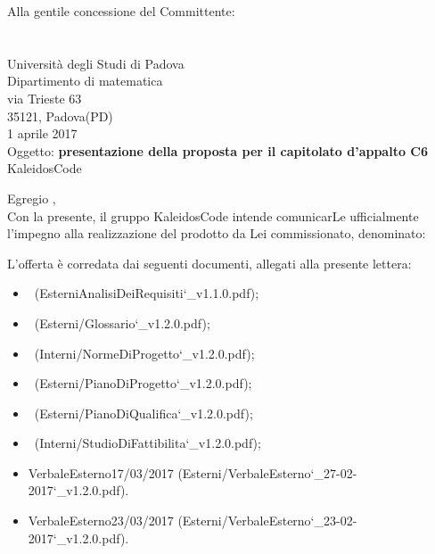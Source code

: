 \documentclass[a4paper,12pt]{article}
\author{KaleidosCode}
\date{10/03/2017}	%
\begin{document}
 	\begin{titlepage}
 		\centering
 		\logo
 		\vspace{1.2cm}
 		\flushright Alla gentile concessione del Committente: \\
 		\vardanega \\
 		\cardin\\
 		Università degli Studi di Padova \\
 		Dipartimento di matematica\\
 		via Trieste 63\\
 		35121, Padova(PD)\\
 		\vspace{0.5cm}
 		1 aprile 2017\\
 		\vspace{1.4cm}
 		\flushleft
 		Oggetto: \textbf{presentazione della proposta per il capitolato d’appalto C6}
 		\vspace{0.4cm}
		\flushleft	\responsabilediprogetto\\
		KaleidosCode 
		
		\vspace{0.6cm}
		Egregio \vardanega ,\\
		\vspace{0.4cm}
		Con la presente, il gruppo KaleidosCode intende comunicarLe ufficialmente l’impegno alla realizzazione del prodotto da Lei commissionato, denominato:
		
		
		L’offerta è corredata dai seguenti documenti, allegati alla presente lettera:
		\begin{itemize}
			\item \analisideirequisitiv\  (EsterniAnalisiDeiRequisiti\char`_v1.1.0.pdf);
			\item \glossariov\  (Esterni/Glossario\char`_v1.2.0.pdf);
			\item \normediprogettov\  (Interni/NormeDiProgetto\char`_v1.2.0.pdf);
			\item \pianodiprogettov\  (Esterni/PianoDiProgetto\char`_v1.2.0.pdf);
			\item \pianodiqualificav\  (Esterni/PianoDiQualifica\char`_v1.2.0.pdf);
			\item \studiodifattibilitav\  (Interni/StudioDiFattibilita\char`_v1.2.0.pdf);
			\item VerbaleEsterno17/03/2017  (Esterni/VerbaleEsterno\char`_27-02-2017\char`_v1.2.0.pdf).
			\item VerbaleEsterno23/03/2017  (Esterni/VerbaleEsterno\char`_23-02-2017\char`_v1.2.0.pdf).
\end{itemize}
		

\end{titlepage}
\end{document}
